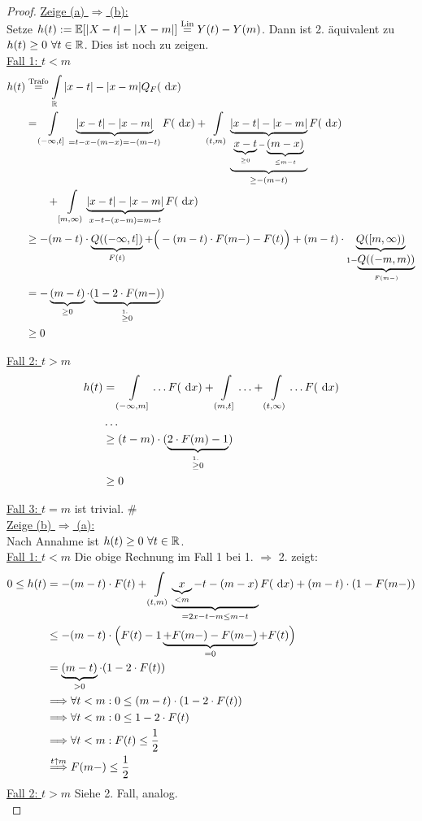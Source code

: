 \begin{proof}
\underline{Zeige (a) $\Rightarrow$ (b):}\\
Setze $h(t):=\mathbb{E}[|X-t|-|X-m|]\stackrel{\text{Lin}}{=}Y(t)-Y(m)$. Dann ist 2. äquivalent zu $h(t)\geq0~\forall t\in\mathbb{R}$. Dies ist noch zu zeigen.\\

\underline{Fall 1: $t<m$}
\begin{align*}
h(t)&\stackrel{\text{Trafo}}{=}
\int\limits_{\mathbb{R}}|x-t|-|x-m| Q_F(\text{ d} x)\\
&=\int\limits_{(-\infty,t]}\underbrace{|x-t|-|x-m|}_{=t-x-(m-x)=-(m-t)} F(\text{ d} x)
+\int\limits_{(t,m)}\underbrace{\underbrace{|x-t|-|x-m|}_{\underbrace{x-t}_{\geq0}-\underbrace{(m-x)}_{\leq m-t}}}_{\geq-(m-t)} F(\text{ d} x)\\
&\qquad
+\int\limits_{[m,\infty)}\underbrace{|x-t|-|x-m|}_{x-t-(x-m)=m-t} F(\text{ d} x)\\
&\geq-(m-t)\cdot \underbrace{Q((-\infty,t])}_{F(t)}+
\Big(-(m-t)\cdot F(m-)-F(t)\Big)
+(m-t)\cdot\underbrace{Q([m,\infty))}_{1-\underbrace{Q((-m,m))}_{F(m-)}}\\
&=-\underbrace{(m-t)}_{\geq0}\cdot(\underbrace{1-2\cdot F(m-)}_{\stackrel{1.}{\geq}0})\\
&\geq0
\end{align*}

\underline{Fall 2: $t> m$}
\begin{align*}
h(t)&=\int\limits_{(-\infty,m]}\ldots F(\text{ d} x)+\int\limits_{(m,t]}\ldots+\int\limits_{(t,\infty)}\ldots F(\text{ d} x)\\
&\ldots\\
&\geq(t-m)\cdot(\underbrace{2\cdot F(m)-1}_{\stackrel{1.}{\geq}0})\\
&\geq0
\end{align*}

\underline{Fall 3: $t=m$} ist trivial. $\#$\\

\underline{Zeige (b) $\Rightarrow$ (a):}\\
Nach Annahme ist $h(t)\geq0~\forall t\in\mathbb{R}$.\\

\underline{Fall 1: $t<m$} Die obige Rechnung im Fall 1 bei 1. $\Rightarrow$ 2. zeigt:
\begin{align*}
0\leq h(t)&=-(m-t)\cdot F(t)+\int\limits_{(t,m)}\underbrace{\underbrace{x}_{<m}-t-(m-x) }_{=2x-t-m\leq m-t}F(\text{ d} x)+(m-t)\cdot(1-F(m-))\\
&\leq-(m-t)\cdot\Big(F(t)-1\underbrace{+F(m-)-F(m-)}_{=0}+F(t)\Big)\\
&=\underbrace{(m-t)}_{>0}\cdot(1-2\cdot F(t))\\
&\Longrightarrow\forall t<m:0\leq(m-t)\cdot(1-2\cdot F(t))\\
&\Longrightarrow\forall t<m:0\leq 1-2\cdot F(t)\\
&\Longrightarrow\forall t<m:F(t)\leq\frac{1}{2}\\
&\stackrel{t\uparrow m}{\Longrightarrow}F(m-)\leq\frac{1}{2}
\end{align*}
\underline{Fall 2: $t> m$} Siehe 2. Fall, analog.\\


\end{proof}
